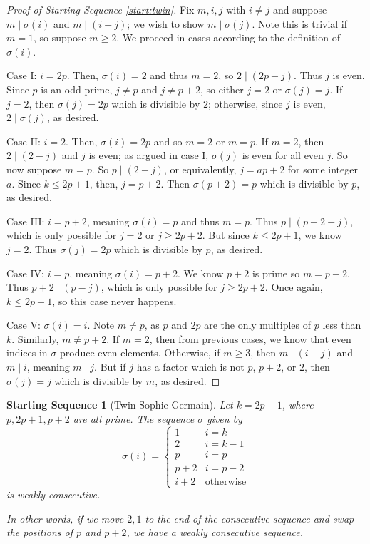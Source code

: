 \documentclass{article}
\newtheorem{startseq}{Starting Sequence}
\theoremstyle{definition}
\theoremstyle{remark}
\numberwithin{equation}{section}
\numberwithin{case}{theorem}
\begin{document}
\begin{proof}[Proof of Starting Sequence \ref{start:twin}]
    Fix $m, i, j$ with $i \neq j$ and suppose $m \mid \sigma(i)$ and $m \mid (i - j)$; we wish to show $m \mid \sigma(j)$. Note this is trivial if $m = 1$, so suppose $m \geq 2$. We proceed in cases according to the definition of $\sigma(i)$. 

    Case I: $i = 2p$. Then, $\sigma(i) = 2$ and thus $m = 2$, so $2 \mid (2p - j)$. Thus $j$ is even. Since $p$ is an odd prime, $j \neq p$ and $j \neq p + 2$, so either $j = 2$ or $\sigma(j) = j$. If $j = 2$, then $\sigma(j) = 2p$ which is divisible by $2$; otherwise, since $j$ is even, $2 \mid \sigma(j)$, as desired.

    Case II: $i = 2$. Then, $\sigma(i) = 2p$ and so $m = 2$ or $m = p$. If $m = 2$, then $2 \mid (2 - j)$ and $j$ is even; as argued in case I, $\sigma(j)$ is even for all even $j$. So now suppose $m = p$. So $p \mid (2 - j)$, or equivalently, $j = ap + 2$ for some integer $a$. Since $k \leq 2p + 1$, then, $j = p + 2$. Then $\sigma(p+2) = p$ which is divisible by $p$, as desired.

    Case III: $i = p + 2$, meaning $\sigma(i) = p$ and thus $m = p$. Thus $p \mid (p+2 - j)$, which is only possible for $j = 2$ or $j \geq 2p + 2$. But since $k \leq 2p + 1$, we know $j = 2$. Thus $\sigma(j) = 2p$ which is divisible by $p$, as desired.

    Case IV: $i = p$, meaning $\sigma(i) = p + 2$. We know $p+2$ is prime so $m = p + 2$. Thus $p + 2 \mid (p - j)$, which is only possible for $j \geq 2p + 2$. Once again, $k \leq 2p + 1$, so this case never happens.

    Case V: $\sigma(i) = i$. Note $m \neq p$, as $p$ and $2p$ are the only multiples of $p$ less than $k$. Similarly, $m \neq p + 2$. If $m = 2$, then from previous cases, we know that even indices in $\sigma$ produce even elements. Otherwise, if $m \geq 3$, then $m \mid (i - j)$ and $m \mid i$, meaning $m \mid j$. But if $j$ has a factor which is not $p$, $p+2$, or $2$, then $\sigma(j) = j$ which is divisible by $m$, as desired.
\end{proof}

\begin{startseq}[Twin Sophie Germain] \label{start:germain}
    Let $k=2p-1$, where $p, 2p+1, p+2$ are all prime. The sequence $\sigma$ given by 
    $$\sigma(i) = \begin{cases} 
          1 & i = k \\
          2 & i = k-1 \\
          p & i = p \\
          p+2 & i = p-2 \\
          i+2 & \text{otherwise}
       \end{cases}$$
    is weakly consecutive.

    In other words, if we move $2,1$ to the end of the consecutive sequence and swap the positions of $p$ and $p+2$, we have a weakly consecutive sequence.
    
\end{startseq}
\end{document}
